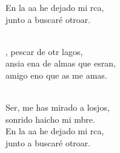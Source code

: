 \documentclass[12pt]{article}
\begin{document}
\begin{multicols*}{2}
\begin{cancion}
\begin{chorus}
	En la aa he dejado mi rca,\\
	junto a  buscaré otroar.\\
	\end{chorus}%
	\jump\\
	, pescar de otr lagos, \\
	ansia ena de almas que esran,\\
	amigo eno que as me amas.\\\jump\\
	\begin{chorus}%
	Ser, me has mirado a losjos,\\
	sonrido haicho mi mbre.\\
	En la aa he dejado mi rca,\\
	junto a  buscaré otroar.\\
	\end{chorus}%
	\jump\\
\end{cancion}%


\end{multicols*}
\end{document}
